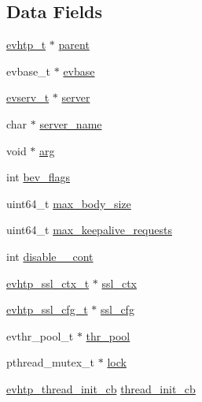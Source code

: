 \subsection*{\-Data \-Fields}
\begin{DoxyCompactItemize}
\item 
\hyperlink{evhtp_8h_aa670c92d77f9a732e03a7d48ada2b31b}{evhtp\-\_\-t} $\ast$ \hyperlink{structevhtp__s_adff9fa3bd346936d706e1a30c3bf4ca1}{parent}
\item 
evbase\-\_\-t $\ast$ \hyperlink{structevhtp__s_abc4ce26b166a97e5766105f253a4fe21}{evbase}
\item 
\hyperlink{evhtp_8h_accea3745ada200d1acc361354315579c}{evserv\-\_\-t} $\ast$ \hyperlink{structevhtp__s_adbf9415567b9a26229148539d64a5eda}{server}
\item 
char $\ast$ \hyperlink{structevhtp__s_a4e06dd572147d48785afd0439576487a}{server\-\_\-name}
\item 
void $\ast$ \hyperlink{structevhtp__s_a9ce2ec4812a92cb6ab39f6e81e9173a9}{arg}
\item 
int \hyperlink{structevhtp__s_a8d3f621cd735373f6657f8ea1a4d21de}{bev\-\_\-flags}
\item 
uint64\-\_\-t \hyperlink{structevhtp__s_ac0c51866465cd3ccc68751b0ce806cbc}{max\-\_\-body\-\_\-size}
\item 
uint64\-\_\-t \hyperlink{structevhtp__s_a79992dc6217af1d8e8801040ca6ef21e}{max\-\_\-keepalive\-\_\-requests}
\item 
int \hyperlink{structevhtp__s_a806a6ea42290c69038c482e6a266db12}{disable\-\_\-\_\-cont}
\item 
\hyperlink{evhtp_8h_a3a45854457c03a9028160078945046da}{evhtp\-\_\-ssl\-\_\-ctx\-\_\-t} $\ast$ \hyperlink{structevhtp__s_a21d5d9eef41ecdb08b82db795aa6da98}{ssl\-\_\-ctx}
\item 
\hyperlink{evhtp_8h_adb4d7b6af31986dd5a7a33f5ac41dde6}{evhtp\-\_\-ssl\-\_\-cfg\-\_\-t} $\ast$ \hyperlink{structevhtp__s_afb6cdde78523e94fa84f57e55280513f}{ssl\-\_\-cfg}
\item 
evthr\-\_\-pool\-\_\-t $\ast$ \hyperlink{structevhtp__s_a350014aec537fdf8ef6f82efe17d5757}{thr\-\_\-pool}
\item 
pthread\-\_\-mutex\-\_\-t $\ast$ \hyperlink{structevhtp__s_a33586b4184d23f2b8f4df153ec23af13}{lock}
\item 
\hyperlink{evhtp_8h_a162b617e19f372264cc22388dce03f2e}{evhtp\-\_\-thread\-\_\-init\-\_\-cb} \hyperlink{structevhtp__s_af7bcd46ddf1d6d7dde1383c28f746e97}{thread\-\_\-init\-\_\-cb}
\item 

\end{DoxyCompactItemize}
